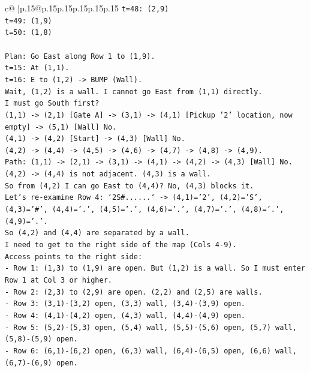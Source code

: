 \documentclass{article}
\begin{document}
{\begin{supertabular}{c@{$\;$}|p{.15\linewidth}@{}p{.15\linewidth}p{.15\linewidth}p{.15\linewidth}p{.15\linewidth}p{.15\linewidth}}
{{{\texttt{t=48: (2,9)} \\
\texttt{t=49: (1,9)} \\
\texttt{t=50: (1,8)} \\
\\ 
\texttt{Plan: Go East along Row 1 to (1,9).} \\
\texttt{t=15: At (1,1).} \\
\texttt{t=16: E to (1,2) {-}> BUMP (Wall).} \\
\texttt{Wait, (1,2) is a wall. I cannot go East from (1,1) directly.} \\
\texttt{I must go South first?} \\
\texttt{(1,1) {-}> (2,1) {[}Gate A{]} {-}> (3,1) {-}> (4,1) {[}Pickup '2' location, now empty{]} {-}> (5,1) {[}Wall{]} No.} \\
\texttt{(4,1) {-}> (4,2) {[}Start{]} {-}> (4,3) {[}Wall{]} No.} \\
\texttt{(4,2) {-}> (4,4) {-}> (4,5) {-}> (4,6) {-}> (4,7) {-}> (4,8) {-}> (4,9).} \\
\texttt{Path: (1,1) {-}> (2,1) {-}> (3,1) {-}> (4,1) {-}> (4,2) {-}> (4,3) {[}Wall{]} No.} \\
\texttt{(4,2) {-}> (4,4) is not adjacent. (4,3) is a wall.} \\
\texttt{So from (4,2) I can go East to (4,4)? No, (4,3) blocks it.} \\
\texttt{Let's re{-}examine Row 4: `2S\#......` {-}> (4,1)='2', (4,2)='S', (4,3)='\#', (4,4)='.', (4,5)='.', (4,6)='.', (4,7)='.', (4,8)='.', (4,9)='.'.} \\
\texttt{So (4,2) and (4,4) are separated by a wall.} \\
\texttt{I need to get to the right side of the map (Cols 4{-}9).} \\
\texttt{Access points to the right side:} \\
\texttt{{-} Row 1: (1,3) to (1,9) are open. But (1,2) is a wall. So I must enter Row 1 at Col 3 or higher.} \\
\texttt{{-} Row 2: (2,3) to (2,9) are open. (2,2) and (2,5) are walls.} \\
\texttt{{-} Row 3: (3,1){-}(3,2) open, (3,3) wall, (3,4){-}(3,9) open.} \\
\texttt{{-} Row 4: (4,1){-}(4,2) open, (4,3) wall, (4,4){-}(4,9) open.} \\
\texttt{{-} Row 5: (5,2){-}(5,3) open, (5,4) wall, (5,5){-}(5,6) open, (5,7) wall, (5,8){-}(5,9) open.} \\
\texttt{{-} Row 6: (6,1){-}(6,2) open, (6,3) wall, (6,4){-}(6,5) open, (6,6) wall, (6,7){-}(6,9) open.} \\
}}}
\end{supertabular}}
\end{document}
